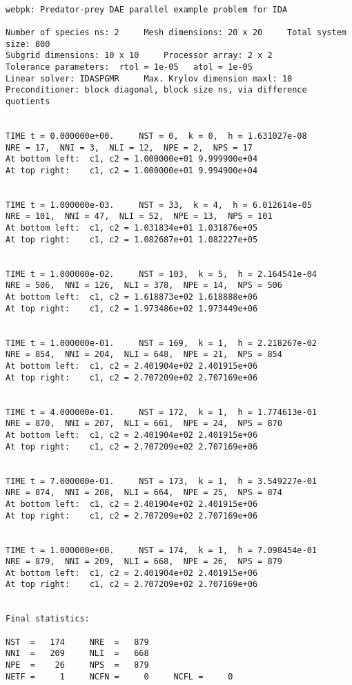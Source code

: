 \small
\begin{verbatim}

webpk: Predator-prey DAE parallel example problem for IDA 

Number of species ns: 2     Mesh dimensions: 20 x 20     Total system size: 800
Subgrid dimensions: 10 x 10     Processor array: 2 x 2
Tolerance parameters:  rtol = 1e-05   atol = 1e-05
Linear solver: IDASPGMR     Max. Krylov dimension maxl: 10
Preconditioner: block diagonal, block size ns, via difference quotients 


TIME t = 0.000000e+00.     NST = 0,  k = 0,  h = 1.631027e-08
NRE = 17,  NNI = 3,  NLI = 12,  NPE = 2,  NPS = 17
At bottom left:  c1, c2 = 1.000000e+01 9.999900e+04 
At top right:    c1, c2 = 1.000000e+01 9.994900e+04 


TIME t = 1.000000e-03.     NST = 33,  k = 4,  h = 6.012614e-05
NRE = 101,  NNI = 47,  NLI = 52,  NPE = 13,  NPS = 101
At bottom left:  c1, c2 = 1.031834e+01 1.031876e+05 
At top right:    c1, c2 = 1.082687e+01 1.082227e+05 


TIME t = 1.000000e-02.     NST = 103,  k = 5,  h = 2.164541e-04
NRE = 506,  NNI = 126,  NLI = 378,  NPE = 14,  NPS = 506
At bottom left:  c1, c2 = 1.618873e+02 1.618888e+06 
At top right:    c1, c2 = 1.973486e+02 1.973449e+06 


TIME t = 1.000000e-01.     NST = 169,  k = 1,  h = 2.218267e-02
NRE = 854,  NNI = 204,  NLI = 648,  NPE = 21,  NPS = 854
At bottom left:  c1, c2 = 2.401904e+02 2.401915e+06 
At top right:    c1, c2 = 2.707209e+02 2.707169e+06 


TIME t = 4.000000e-01.     NST = 172,  k = 1,  h = 1.774613e-01
NRE = 870,  NNI = 207,  NLI = 661,  NPE = 24,  NPS = 870
At bottom left:  c1, c2 = 2.401904e+02 2.401915e+06 
At top right:    c1, c2 = 2.707209e+02 2.707169e+06 


TIME t = 7.000000e-01.     NST = 173,  k = 1,  h = 3.549227e-01
NRE = 874,  NNI = 208,  NLI = 664,  NPE = 25,  NPS = 874
At bottom left:  c1, c2 = 2.401904e+02 2.401915e+06 
At top right:    c1, c2 = 2.707209e+02 2.707169e+06 


TIME t = 1.000000e+00.     NST = 174,  k = 1,  h = 7.098454e-01
NRE = 879,  NNI = 209,  NLI = 668,  NPE = 26,  NPS = 879
At bottom left:  c1, c2 = 2.401904e+02 2.401915e+06 
At top right:    c1, c2 = 2.707209e+02 2.707169e+06 


Final statistics: 

NST  =   174     NRE  =   879
NNI  =   209     NLI  =   668
NPE  =    26     NPS  =   879
NETF =     1     NCFN =     0     NCFL =     0

\end{verbatim}



